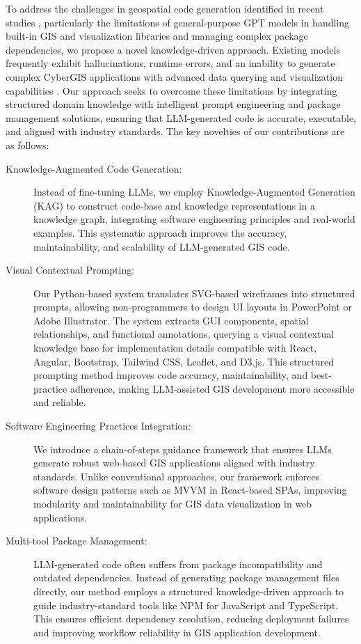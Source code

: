 To address the challenges in geospatial code generation identified in recent studies \citep{hou2024can, hou2024geocode}, particularly the limitations of general-purpose GPT models in handling built-in GIS and visualization libraries and managing complex package dependencies, we propose a novel knowledge-driven approach. Existing models frequently exhibit hallucinations, runtime errors, and an inability to generate complex CyberGIS applications with advanced data querying and visualization capabilities \citep{hou2024can}. Our approach seeks to overcome these limitations by integrating structured domain knowledge with intelligent prompt engineering and package management solutions, ensuring that LLM-generated code is accurate, executable, and aligned with industry standards. The key novelties of our contributions are as follows:
\begin{description}
\item[Knowledge-Augmented Code Generation:] Instead of fine-tuning LLMs, we employ Knowledge-Augmented Generation (KAG) to construct code-base and knowledge representations in a knowledge graph, integrating software engineering principles and real-world examples. This systematic approach improves the accuracy, maintainability, and scalability of LLM-generated GIS code.

\item[Visual Contextual Prompting:] Our Python-based system translates SVG-based wireframes into structured prompts, allowing non-programmers to design UI layouts in PowerPoint or Adobe Illustrator. The system extracts GUI components, spatial relationships, and functional annotations, querying a visual contextual knowledge base for implementation details compatible with React, Angular, Bootstrap, Tailwind CSS, Leaflet, and D3.js. This structured prompting method improves code accuracy, maintainability, and best-practice adherence, making LLM-assisted GIS development more accessible and reliable.

\item[Software Engineering Practices Integration:] We introduce a chain-of-steps guidance framework that ensures LLMs generate robust web-based GIS applications aligned with industry standards. Unlike conventional approaches, our framework enforces software design patterns such as MVVM in React-based SPAs, improving modularity and maintainability for GIS data visualization in web applications.

\item[Multi-tool Package Management:] LLM-generated code often suffers from package incompatibility and outdated dependencies. Instead of generating package management files directly, our method employs a structured knowledge-driven approach to guide industry-standard tools like NPM for JavaScript and TypeScript. This ensures efficient dependency resolution, reducing deployment failures and improving workflow reliability in GIS application development. 
\end{description}

